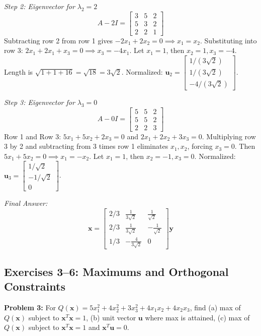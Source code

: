 \documentclass[11pt, letterpaper]{article}
\theoremstyle{definition}
\theoremstyle{remark}
\begin{document}
\textit{Step 2: Eigenvector for $\lambda_2 = 2$}
\[ A - 2I = \begin{bmatrix} 3 & 5 & 2 \\ 5 & 3 & 2 \\ 2 & 2 & 1 \end{bmatrix} \]
Subtracting row 2 from row 1 gives $-2x_1 + 2x_2 = 0 \implies x_1 = x_2$. Substituting into row 3: $2x_1 + 2x_1 + x_3 = 0 \implies x_3 = -4x_1$. Let $x_1 = 1$, then $x_2 = 1, x_3 = -4$. Length is $\sqrt{1+1+16} = \sqrt{18} = 3\sqrt{2}$. Normalized: $\mathbf{u}_2 = \begin{bmatrix} 1/(3\sqrt{2}) \\ 1/(3\sqrt{2}) \\ -4/(3\sqrt{2}) \end{bmatrix}$.

\textit{Step 3: Eigenvector for $\lambda_3 = 0$}
\[ A - 0I = \begin{bmatrix} 5 & 5 & 2 \\ 5 & 5 & 2 \\ 2 & 2 & 3 \end{bmatrix} \]
Row 1 and Row 3: $5x_1 + 5x_2 + 2x_3 = 0$ and $2x_1 + 2x_2 + 3x_3 = 0$. Multiplying row 3 by 2 and subtracting from 3 times row 1 eliminates $x_1, x_2$, forcing $x_3 = 0$. Then $5x_1 + 5x_2 = 0 \implies x_1 = -x_2$. Let $x_1 = 1$, then $x_2 = -1, x_3 = 0$. Normalized: $\mathbf{u}_3 = \begin{bmatrix} 1/\sqrt{2} \\ -1/\sqrt{2} \\ 0 \end{bmatrix}$.

\textit{Final Answer:} 
\[ \mathbf{x} = \begin{bmatrix} 2/3 & \frac{1}{3\sqrt{2}} & \frac{1}{\sqrt{2}} \\ 2/3 & \frac{1}{3\sqrt{2}} & -\frac{1}{\sqrt{2}} \\ 1/3 & -\frac{4}{3\sqrt{2}} & 0 \end{bmatrix} \mathbf{y} \]

\subsection{Exercises 3--6: Maximums and Orthogonal Constraints}

\textbf{Problem 3:} For $Q(\mathbf{x}) = 5x_1^2 + 4x_2^2 + 3x_3^2 + 4x_1x_2 + 4x_2x_3$, find (a) max of $Q(\mathbf{x})$ subject to $\mathbf{x}^T\mathbf{x}=1$, (b) unit vector $\mathbf{u}$ where max is attained, (c) max of $Q(\mathbf{x})$ subject to $\mathbf{x}^T\mathbf{x}=1$ and $\mathbf{x}^T\mathbf{u}=0$.
\end{document}
